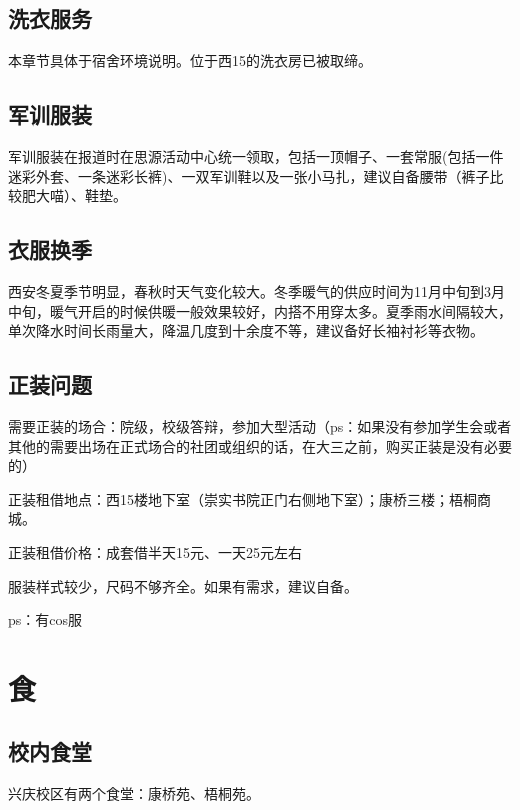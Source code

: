\documentclass[
decoration,  %
]{qyxf-book}
\begin{document}
	\hypertarget{ux6d17ux8863ux670dux52a1}{%
		\subsection{洗衣服务}\label{ux6d17ux8863ux670dux52a1}}
	本章节具体于宿舍环境说明。位于西15的洗衣房已被取缔。
		
	\hypertarget{ux519bux8badux670dux88c5}{%
		\subsection{军训服装}\label{ux519bux8badux670dux88c5}}
	
	军训服装在报道时在思源活动中心统一领取，包括一顶帽子、一套常服(包括一件迷彩外套、一条迷彩长裤)、一双军训鞋以及一张小马扎，建议自备腰带（裤子比较肥大喵）、鞋垫。
	
	\hypertarget{ux8863ux670dux6362ux5b63}{%
		\subsection{衣服换季}\label{ux8863ux670dux6362ux5b63}}
	
	西安冬夏季节明显，春秋时天气变化较大。冬季暖气的供应时间为11月中旬到3月中旬，暖气开启的时候供暖一般效果较好，内搭不用穿太多。夏季雨水间隔较大，单次降水时间长雨量大，降温几度到十余度不等，建议备好长袖衬衫等衣物。
	
	\hypertarget{ux6b63ux88c5ux95eeux9898}{%
		\subsection{正装问题}\label{ux6b63ux88c5ux95eeux9898}}
	
	需要正装的场合：院级，校级答辩，参加大型活动（ps：如果没有参加学生会或者其他的需要出场在正式场合的社团或组织的话，在大三之前，购买正装是没有必要的）
	
	正装租借地点：西15楼地下室（崇实书院正门右侧地下室）；康桥三楼；梧桐商城。
	
	正装租借价格：成套借半天15元、一天25元左右
	
	服装样式较少，尺码不够齐全。如果有需求，建议自备。
	
	ps：有cos服
	
	\section{食}
	\subsection{校内食堂}
	兴庆校区有两个食堂：康桥苑、梧桐苑。
	
\end{document}

